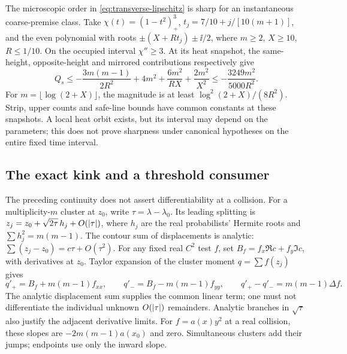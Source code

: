 The microscopic order in \eqref{eq:transverse-lipschitz} is sharp for
an instantaneous coarse-premise class. Take
\(\chi(t)=(1-t^2)^3_+\), \(t_j=7/10+j/[10(m+1)]\), and the even
polynomial with roots \(\pm(X+Rt_j)\pm\ii/2\), where
\(m\ge2\), \(X\ge10\), \(R\le1/10\). On the occupied interval
\(\chi''\ge3\). At its heat snapshot, the same-height, opposite-height
and mirrored contributions respectively give
\[
 Q_s\le-\frac{3m(m-1)}{2R^2}+4m^2+
             \frac{6m^2}{RX}+\frac{2m^2}{X^2}
       \le-\frac{3249m^2}{5000R^2}.
\]
For \(m=\lfloor\log(2+X)\rfloor\), the magnitude is at least
\(\log^2(2+X)/(8R^2)\). Strip, upper counts and safe-line bounds have
common constants at these snapshots. A local heat orbit exists, but its
interval may depend on the parameters; this does not prove sharpness
under canonical hypotheses on the entire fixed time interval.

\subsection{The exact kink and a threshold consumer}
The preceding continuity does not assert differentiability at a
collision. For a multiplicity-\(m\) cluster at \(z_0\), write
\(\tau=\lambda-\lambda_0\). Its leading splitting is
\(z_j=z_0+\sqrt{2\tau}\,h_j+O(\left|\tau\right|)\), where \(h_j\)
are the real probabilists' Hermite roots and
\(\sum h_j^2=m(m-1)\). The contour sum of displacements is analytic:
\(\sum(z_j-z_0)=c\tau+O(\tau^2)\). For any fixed real \(C^2\) test
\(f\), set \(B_f=f_x\Re c+f_y\Im c\), with derivatives at \(z_0\).
Taylor expansion of the cluster moment \(q=\sum f(z_j)\) gives
\begin{equation}\label{eq:collision-kink}
 q'_+=B_f+m(m-1)f_{xx},\qquad
 q'_-=B_f-m(m-1)f_{yy},\qquad
 q'_+-q'_-=m(m-1)\Delta f.
\end{equation}
The analytic displacement sum supplies the common linear term; one
must not differentiate the individual unknown \(O(\left|\tau\right|)\)
remainders. Analytic branches in \(\sqrt\tau\) also justify the
adjacent derivative limits. For \(f=a(x)y^2\) at a real collision,
these slopes are \(-2m(m-1)a(x_0)\) and zero. Simultaneous clusters
add their jumps; endpoints use only the inward slope.

